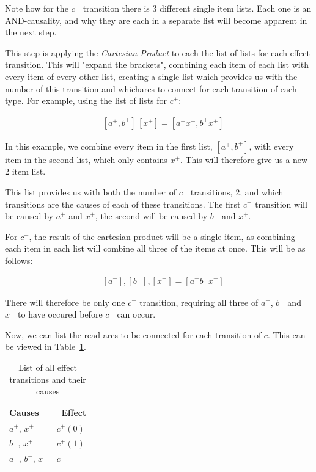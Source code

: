 \documentclass[british,conference,compsoc]{IEEEtran}
\begin{document}
\noindent Note how for the $c^{-}$ transition there is 3 different single item 
lists. Each one is an AND-causality, and why they are each in a separate list
will become apparent in the next step. 

This step is applying the \emph{Cartesian Product} to each the list of lists
for each effect transition. This will "expand the brackets", combining each
item of each list with every item of every other list, creating a single list 
which provides us with the number of this transition and  whicharcs to connect 
for each transition of each type. For example, using the list of lists for 
$c^{+}$:

\[
\begin{array}{lcl}
~&[a^{+}, b^{+}]\, [x^{+}] = [a^{+} x^{+}, b^{+} x^{+}]
\end{array}
\]

\noindent In this example, we combine every item in the first list,
$[a^{+}, b^{+}]$, with every item in the second list, which only 
contains $x^{+}$. This will therefore give us a new 2 item list. 

This list provides us with both the number of $c^{+}$ transitions,
2, and which transitions are the causes of each of these transitions.
The first $c^{+}$ transition will be caused by $a^{+}$ and $x^{+}$,
the second will be caused by $b^{+}$ and $x^{+}$. 

For $c^{-}$, the result of the cartesian product will be a single item,
as combining each item in each list will combine all three of the items 
at once. This will be as follows:

\[
\begin{array}{lcl}
~&[a^{-}], [b^{-}], [x^{-}]  = [a^{-} b^{-} x^{-}]
\end{array}
\]

\noindent There will therefore be only one $c^{-}$ transition, requiring all 
three of $a^{-}$, $b^{-}$ and $x^{-}$ to have occured before $c^{-}$ can occur. 

Now, we can list the read-arcs to be connected for each transition of $c$.
This can be viewed in Table~\ref{tab:list-by-transition}.

\begin{table}[h]
\caption{List of all effect transitions and their causes
		\label{tab:list-by-transition}}

  \centering
\begin{tabular}[htb]{| m{2.6cm} | m{2.0cm} |}
  \hline
Causes & \, Effect \\ \hline \hline
$a^{+}$, $x^{+}$ & $c^{+}(0)$ \\ \hline
$b^{+}$, $x^{+}$ & $c^{+}(1)$ \\ \hline
$a^{-}$, $b^{-}$, $x^{-}$ & $c^{-}$ \\ \hline
  \end{tabular}
\end{table}
\end{document}
